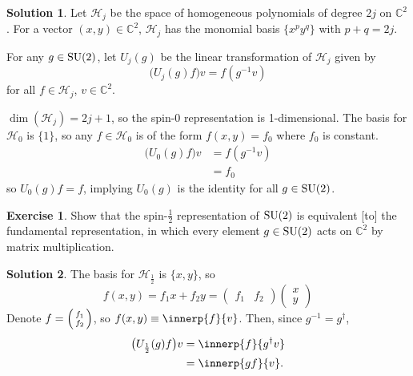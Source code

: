 \documentclass[11pt, a4paper]{report}
\theoremstyle{definition}
\newtheorem{ex}{Exercise}[part]
\newtheorem{sol}{Solution}[part]
\newcommand*{\SU}{\ensuremath\text{SU}}
\begin{document}
\begin{sol}

Let $\mathcal{H}_j$ be the space of homogeneous polynomials of degree $2j$ on $\mathbb{C}^2$.
For a vector $(x, y) \in \mathbb{C}^2$, $\mathcal{H}_j$ has the monomial basis $\{x^p y^q\}$ with $p + q = 2j$.

For any $g \in \SU(2)$, let $U_j(g)$ be the linear transformation of $\mathcal{H}_j$ given by
\[
    \bigl(U_j(g) f\bigr) v = f(g^{-1} v)
\]
for all $f \in \mathcal{H}_j$, $v \in \mathbb{C}^2$.

$\dim(\mathcal{H}_j) = 2j + 1$, so the spin-0 representation is 1-dimensional.
The basis for $\mathcal{H}_0$ is $\{1\}$, so any $f \in \mathcal{H}_0$ is of the form $f(x, y) = f_0$ where $f_0$ is constant.
\begin{align*}
    \bigl( U_0(g) f \bigr) v &= f(g^{-1} v) \\
                             &= f_0
\end{align*}
so $U_0(g) f = f$, implying $U_0(g)$ is the identity for all $g \in \SU(2)$.

\end{sol}

\begin{ex}

Show that the spin-$\frac{1}{2}$ representation of $\SU(2)$ is equivalent [to] the fundamental representation, in which every element $g \in \SU(2)$ acts on $\mathbb{C}^2$ by matrix multiplication.

\end{ex}

\begin{sol}

The basis for $\mathcal{H}_\frac{1}{2}$ is $\{x, y\}$, so
\[
    f(x, y) = f_1 x + f_2 y =
    \begin{pmatrix}
        f_1 & f_2
    \end{pmatrix}
    \begin{pmatrix}
        x \\ y
    \end{pmatrix}
\]
Denote $f = \begin{psmallmatrix} f_1 \\ f_2 \end{psmallmatrix}$, so $f(x, y) \equiv \innerp{f}{v}$.
Then, since $g^{-1} = g^\dagger$,
\begin{align*}
    \bigl( U_\frac{1}{2}(g) f \bigr) v &= \innerp{f}{g^\dagger v} \\
                                       &= \innerp{gf}{v}.
\end{align*}

\end{sol}
\end{document}
